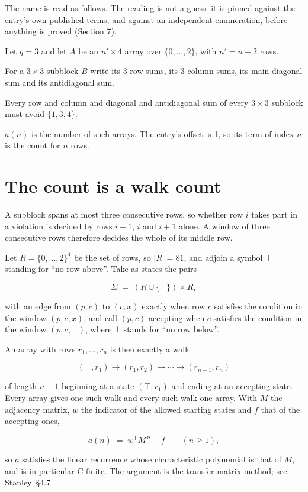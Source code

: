 \documentclass[11pt]{article}
\theoremstyle{definition}
\begin{document}
The name is read as follows. The reading is not a guess: it is pinned against the entry's own published terms, and against an independent enumeration, before anything is proved (Section 7).

Let $q = 3$ and let $A$ be an $n' \times 4$ array over $\{0,\dots,2\}$, with $n' = n + 2$ rows.

For a $3\times3$ subblock $B$ write its 3 row sums, its 3 column sums, its main-diagonal sum and its antidiagonal sum.

Every row and column and diagonal and antidiagonal sum of every $3\times3$ subblock must avoid $\{1, 3, 4\}$.

$a(n)$ is the number of such arrays. The entry's offset is 1, so its term of index $n$ is the count for $n$ rows.

\section{The count is a walk count}

A subblock spans at most three consecutive rows, so whether row $i$ takes part in a violation is decided by rows $i-1$, $i$ and $i+1$ alone. A window of three consecutive rows therefore decides the whole of its middle row.

Let $R = \{0,\dots,2\}^{4}$ be the set of rows, so $|R| = 81$, and adjoin a symbol $\top$ standing for ``no row above''. Take as states the pairs

\[\Sigma \;=\; (R \cup \{\top\}) \times R,\]

with an edge from $(p,c)$ to $(c,x)$ exactly when row $c$ satisfies the condition in the window $(p,c,x)$, and call $(p,c)$ accepting when $c$ satisfies the condition in the window $(p,c,\bot)$, where $\bot$ stands for ``no row below''.

An array with rows $r_1,\dots,r_n$ is then exactly a walk

\[(\top,r_1) \to (r_1,r_2) \to \cdots \to (r_{n-1},r_n)\]

of length $n-1$ beginning at a state $(\top,r_1)$ and ending at an accepting state. Every array gives one such walk and every such walk one array. With $M$ the adjacency matrix, $w$ the indicator of the allowed starting states and $f$ that of the accepting ones,

\[a(n) \;=\; w^{\mathsf T} M^{\,n-1} f \qquad (n \ge 1),\]

so $a$ satisfies the linear recurrence whose characteristic polynomial is that of $M$, and is in particular C-finite. The argument is the transfer-matrix method; see Stanley~\S4.7.
\end{document}
